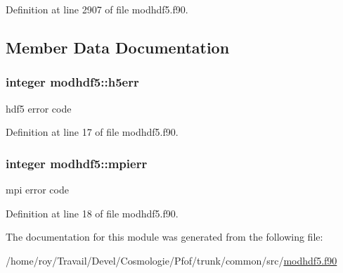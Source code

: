 Definition at line 2907 of file modhdf5.\-f90.



\subsection{Member Data Documentation}
\hypertarget{classmodhdf5_a3521606545551f2d5b2222712873b228}{
\subsubsection[{h5err}]{\setlength{\rightskip}{0pt plus 5cm}integer modhdf5\-::h5err\hspace{0.3cm}{\ttfamily [private]}}}\label{classmodhdf5_a3521606545551f2d5b2222712873b228}


hdf5 error code 



Definition at line 17 of file modhdf5.\-f90.

\hypertarget{classmodhdf5_a2d3fcdf78d1a95860d10644e0bef1bf7}{
\subsubsection[{mpierr}]{\setlength{\rightskip}{0pt plus 5cm}integer modhdf5\-::mpierr\hspace{0.3cm}{\ttfamily [private]}}}\label{classmodhdf5_a2d3fcdf78d1a95860d10644e0bef1bf7}


mpi error code 



Definition at line 18 of file modhdf5.\-f90.



The documentation for this module was generated from the following file\-:\begin{DoxyCompactItemize}
\item 
/home/roy/\-Travail/\-Devel/\-Cosmologie/\-Pfof/trunk/common/src/\hyperlink{modhdf5_8f90}{modhdf5.\-f90}\end{DoxyCompactItemize}
